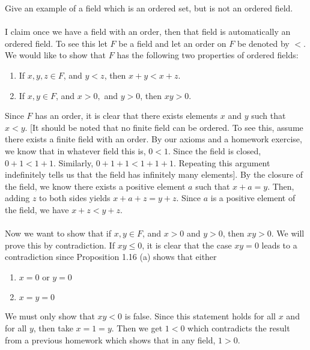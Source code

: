 \documentclass[12pt]{article}
\begin{document}
\problem Give an example of a field which is an ordered set, but is not an ordered field. \\ \\
I claim once we have a field with an order, then that field is automatically an ordered field. To see this let $F$ be a field and let an order on $F$ be denoted by $<$. We would like to show that $F$ has the following two properties of ordered fields: \\
\begin{enumerate}
\item If $x, y, z \in F$, and $y<z$, then $x+y < x+z$.
\item If $x, y \in F$, and $x>0,$ and $y>0$, then $xy>0$. 
\end{enumerate}
Since $F$ has an order, it is clear that there exists elements $x$ and $y$ such that $x<y$. [It should be noted that no finite field can be ordered. To see this, assume there exists a finite field with an order. By our axioms and a homework exercise, we know that in whatever field this is, $0<1$. Since the field is closed, $0+1<1+1$. Similarly, $0+1+1<1+1+1$. Repeating this argument indefinitely tells us that the field  has infinitely many elements]. By the closure of the field, we know there exists a positive element $a$ such that $x+a=y$. Then, adding $z$ to both sides yields $x+a+z=y+z$. Since $a$ is a positive element of the field, we have $x+z<y+z$. \\ \\
Now we want to show that if $x, y \in F$, and $x>0$ and $y>0$, then $xy>0$. We will prove this by contradiction. If $xy \leq 0$, it is clear that the case $xy=0$ leads to a contradiction since Proposition 1.16 (a) shows that either
\begin{enumerate}
\item $x=0$ or $y=0$
\item $x=y=0$
\end{enumerate}

\noindent We must only show that $xy < 0$ is false. Since this statement holds for all $x$ and for all $y$, then take $x=1=y$. Then we get $1<0$ which contradicts the result from a previous homework which shows that in any field, $1>0$. 



 
\end{document}
